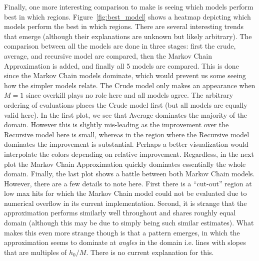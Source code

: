 		Finally, one more interesting comparison to make is seeing which models perform best in which regions. Figure~\ref{fig:best_model} shows a heatmap depicting which models perform the best in which regions. There are several interesting trends that emerge (although their explanations are unknown but likely arbitrary). The comparison between all the models are done in three stages: first the crude, average, and recursive model are compared, then the Markov Chain Approximation is added, and finally all 5 models are compared. This is done since the Markov Chain models dominate, which would prevent us some seeing how the simpler models relate. The Crude model only makes an appearance when $M=1$ since overkill plays no role here and all models agree. The arbitrary ordering of evaluations places the Crude model first (but all models are equally valid here). In the first plot, we see that Average dominates the majority of the domain. However this is slightly mis-leading as the improvement over the Recursive model here is small, whereas in the region where the Recursive model dominates the improvement is substantial. Perhaps a better visualization would interpolate the colors depending on relative improvement. Regardless, in the next plot the Markov Chain Approximation quickly dominates essentially the whole domain. Finally, the last plot shows a battle between both Markov Chain models. However, there are a few details to note here. First there is a ``cut-out'' region at low max hits for which the Markov Chain model could not be evaluated due to numerical overflow in its current implementation. Second, it is strange that the approximation performs similarly well throughout and shares roughly equal domain (although this may be due to simply being such similar estimates). What makes this even more strange though is that a pattern emerges, in which the approximation seems to dominate at \textit{angles} in the domain i.e. lines with slopes that are multiples of $h_0/M$. There is no current explanation for this.
